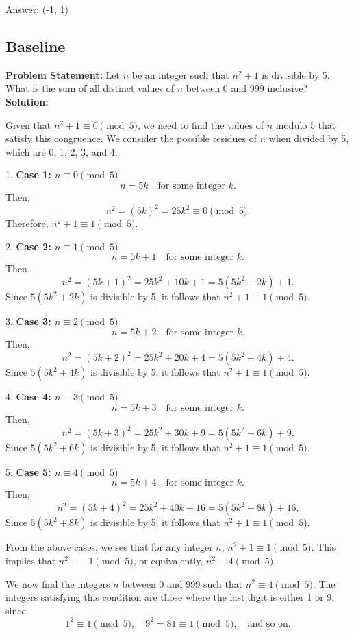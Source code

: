 \documentclass[11pt]{article}
\begin{document}
Answer: (-1, 1)

\subsection*{Baseline}

\textbf{Problem Statement:}
Let \( n \) be an integer such that \( n^2 + 1 \) is divisible by 5. What is the sum of all distinct values of \( n \) between 0 and 999 inclusive?
\medskip
\textbf{Solution:}

Given that \( n^2 + 1 \equiv 0 \pmod{5} \), we need to find the values of \( n \) modulo 5 that satisfy this congruence. We consider the possible residues of \( n \) when divided by 5, which are 0, 1, 2, 3, and 4.

1. \textbf{Case 1: \( n \equiv 0 \pmod{5} \)}
   \[
   n = 5k \quad \text{for some integer } k.
   \]
   Then,
   \[
   n^2 = (5k)^2 = 25k^2 \equiv 0 \pmod{5}.
   \]
   Therefore, \( n^2 + 1 \equiv 1 \pmod{5} \).

2. \textbf{Case 2: \( n \equiv 1 \pmod{5} \)}
   \[
   n = 5k + 1 \quad \text{for some integer } k.
   \]
   Then,
   \[
   n^2 = (5k + 1)^2 = 25k^2 + 10k + 1 = 5(5k^2 + 2k) + 1.
   \]
   Since \( 5(5k^2 + 2k) \) is divisible by 5, it follows that \( n^2 + 1 \equiv 1 \pmod{5} \).

3. \textbf{Case 3: \( n \equiv 2 \pmod{5} \)}
   \[
   n = 5k + 2 \quad \text{for some integer } k.
   \]
   Then,
   \[
   n^2 = (5k + 2)^2 = 25k^2 + 20k + 4 = 5(5k^2 + 4k) + 4.
   \]
   Since \( 5(5k^2 + 4k) \) is divisible by 5, it follows that \( n^2 + 1 \equiv 1 \pmod{5} \).

4. \textbf{Case 4: \( n \equiv 3 \pmod{5} \)}
   \[
   n = 5k + 3 \quad \text{for some integer } k.
   \]
   Then,
   \[
   n^2 = (5k + 3)^2 = 25k^2 + 30k + 9 = 5(5k^2 + 6k) + 9.
   \]
   Since \( 5(5k^2 + 6k) \) is divisible by 5, it follows that \( n^2 + 1 \equiv 1 \pmod{5} \).

5. \textbf{Case 5: \( n \equiv 4 \pmod{5} \)}
   \[
   n = 5k + 4 \quad \text{for some integer } k.
   \]
   Then,
   \[
   n^2 = (5k + 4)^2 = 25k^2 + 40k + 16 = 5(5k^2 + 8k) + 16.
   \]
   Since \( 5(5k^2 + 8k) \) is divisible by 5, it follows that \( n^2 + 1 \equiv 1 \pmod{5} \).

From the above cases, we see that for any integer \( n \), \( n^2 + 1 \equiv 1 \pmod{5} \). This implies that \( n^2 \equiv -1 \pmod{5} \), or equivalently, \( n^2 \equiv 4 \pmod{5} \).

We now find the integers \( n \) between 0 and 999 such that \( n^2 \equiv 4 \pmod{5} \). The integers satisfying this condition are those where the last digit is either 1 or 9, since:
\[ 1^2 \equiv 1 \pmod{5}, \quad 9^2 = 81 \equiv 1 \pmod{5}, \quad \text{and so on}. \]
\end{document}
